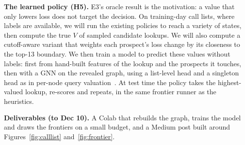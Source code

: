\documentclass{article}
\begin{document}
\textbf{The learned policy (H5).} E3's oracle result is the motivation: a value that only lowers loss does not target the decision. On training-day call lists, where labels are available, we will run the existing policies to reach a variety of states, then compute the true $V$ of sampled candidate lookups. We will also compute a cutoff-aware variant that weights each prospect's loss change by its closeness to the top-13 boundary. We then train a model to predict these values without labels: first from hand-built features of the lookup and the prospects it touches, then with a GNN on the revealed graph, using a list-level head and a singleton head as in per-node query valuation~\cite{zhou2026scout}. At test time the policy takes the highest-valued lookup, re-scores and repeats, in the same frontier runner as the heuristics.

\textbf{Deliverables (to Dec 10).} A Colab that rebuilds the graph, trains the model and draws the frontiers on a small budget, and a Medium post built around Figures~\ref{fig:calllist} and~\ref{fig:frontier}.

\small


\end{document}

